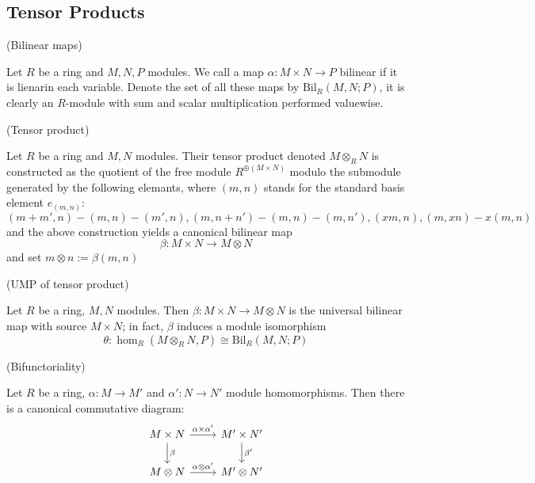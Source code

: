 \documentclass{article}
\begin{document}
\subsection{Tensor Products}

\begin{definition}
    (Bilinear maps)\par
    Let $R$ be a ring and $M,N,P$ modules. We call a map $\alpha: M\times N \to P$ bilinear if it is lienarin each variable. Denote the set of all these maps by $\text{Bil}_R(M,N;P)$, it is clearly an $R$-module with sum and scalar multiplication performed valuewise.
\end{definition}

\begin{definition}
    (Tensor product)\par
    Let $R$ be a ring and $M,N$ modules. Their tensor product denoted $M\otimes_R N$ is constructed as the quotient of the free module $R^{\oplus (M\times N)}$ modulo the submodule generated by the following elemants, where $(m,n)$ stands for the standard basis element $e_{(m,n)}$:
    \[
    (m+m',n)-(m,n)-(m',n), (m,n+n')-(m,n) - (m,n'), (xm,n), (m,xn)-x(m,n)
    \]
    and the above construction yields a canonical bilinear map
    \[
    \beta:M\times N \to M \otimes N
    \]
    and set $m\otimes n:=\beta(m,n)$
\end{definition}

\begin{theorem}
    (UMP of tensor product)\par
    Let $R$ be a ring, $M,N$ modules. Then $\beta:M\times N \to M\otimes N$ is the universal bilinear map with source $M\times N$; in fact, $\beta$ induces a module isomorphism
    \[\theta:\hom_R(M\otimes_R N, P) \cong \text{Bil}_R(M,N;P)\]
\end{theorem}

\begin{corollary}
    (Bifunctoriality)\par
    Let $R$ be a ring, $\alpha:M\to M'$ and $\alpha':N\to N'$ module homomorphisms. Then there is a canonical commutative diagram:
    \[
    \begin{tikzcd}
        M\times N\arrow[r,"\alpha\times\alpha'"]\arrow[d,"\beta"] & M'\times N'\arrow[d,"\beta'"]\\
        M\otimes N\arrow[r, "\alpha\otimes\alpha'"] & M'\otimes N' \\
    \end{tikzcd}
    \]
\end{corollary}
\newpage




\end{document}

